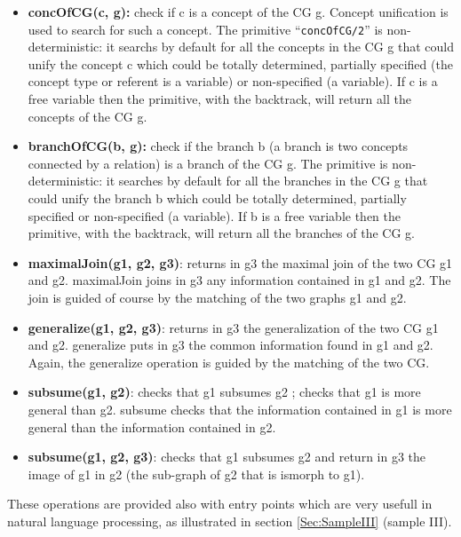 \documentclass{book}
\begin{document}
\begin{itemize}

  \item {\bf concOfCG(c, g):} check if c is a concept of the CG
g. Concept unification is used to search for such a concept.  The
primitive ``\texttt{concOfCG/2}'' is non-deterministic: it searchs by
default for all the concepts in the CG g that could unify the concept
c which could be totally determined, partially specified (the concept
type or referent is a variable) or non-specified (a variable). If c is
a free variable then the primitive, with the backtrack, will return
all the concepts of the CG g.

  \item {\bf branchOfCG(b, g):} check if the branch b (a branch is two
concepts connected by a relation) is a branch of the CG g. The
primitive is non-deterministic: it searches by default for all the
branches in the CG g that could unify the branch b which could be
totally determined, partially specified or non-specified (a
variable). If b is a free variable then the primitive, with the
backtrack, will return all the branches of the CG g.

  \item {\bf maximalJoin(g1, g2, g3)}: returns in g3 the maximal join
of the two CG g1 and g2. maximalJoin joins in g3 any information
contained in g1 and g2. The join is guided of course by the matching
of the two graphs g1 and g2.

  \item {\bf generalize(g1, g2, g3)}: returns in g3 the generalization
of the two CG g1 and g2. generalize puts in g3 the common information
found in g1 and g2. Again, the generalize operation is guided by the
matching of the two CG.

  \item {\bf subsume(g1, g2)}: checks that g1 subsumes g2 ; checks
that g1 is more general than g2. subsume checks that the information
contained in g1 is more general than the information contained in g2.

  \item {\bf subsume(g1, g2, g3)}: checks that g1 subsumes g2
and return in g3 the image of g1 in g2 (the sub-graph of g2 that is
ismorph to g1).

\end{itemize}

These operations are provided also with entry points which are very
usefull in natural language processing, as illustrated in section
\ref{Sec:SampleIII} (sample III).
\end{document}

